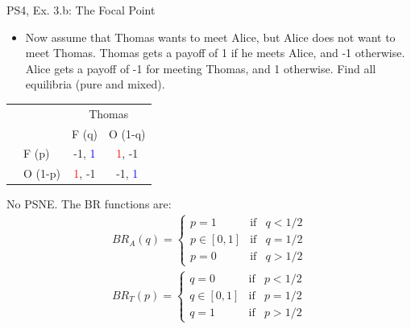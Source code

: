 \begin{frame}{PS4, Ex. 3.b: The Focal Point}
  \begin{multicols}{2}
    \begin{itemize}
      \item[(b)] Now assume that Thomas wants to meet Alice, but Alice does not want to meet Thomas. Thomas gets a payoff of 1 if he meets Alice, and -1 otherwise. Alice gets a payoff of -1 for meeting Thomas, and 1 otherwise. Find all equilibria (pure and mixed).
    \end{itemize}
    \begin{table}
      \begin{tabular}{cl|c|c|}
        & \multicolumn{1}{c}{} & \multicolumn{2}{c}{\color{blue}Thomas}\\
        & \multicolumn{1}{c}{} & \multicolumn{1}{c}{F (q)} & \multicolumn{1}{c}{O (1-q)} \\\cline{3-4}
        \parbox[t]{1mm}{}
        & F (p) & -1, \textcolor{blue}{1} & \textcolor{red}{1}, -1 \\
        & O (1-p) & \textcolor{red}{1}, -1 & -1, \textcolor{blue}{1} \\
      \end{tabular}
    \end{table}
    No PSNE. The BR functions are:
    \begin{align*}
      BR_A(q)=\left\{ \begin{array}{lcl}
          p=1       & \text{if} & q<1/2 \\
          p\in[0,1] & \text{if} & q=1/2 \\
          p=0       & \text{if} & q>1/2
      \end{array}\right. \\
      BR_T(p)=\left\{ \begin{array}{lcl}
          q=0       & \text{if} & p<1/2  \\
          q\in[0,1] & \text{if} & p=1/2 \\
          q=1       & \text{if} & p>1/2
      \end{array}\right.
    \end{align*}
    \vfill\null \columnbreak

\end{multicols}
\end{frame}
